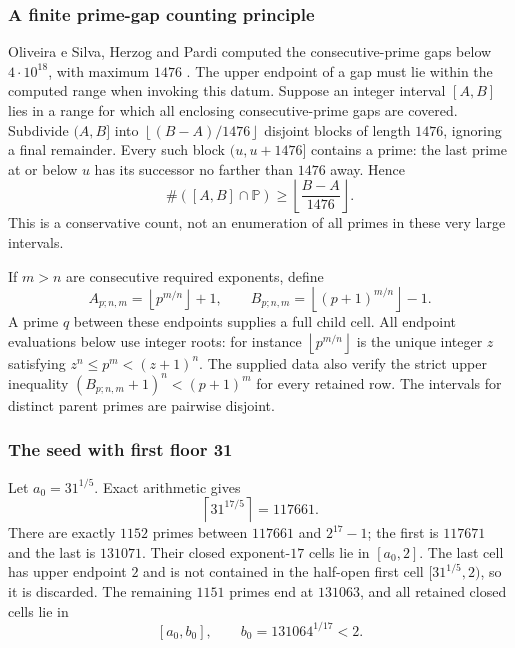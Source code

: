 \documentclass[11pt,a4paper]{article}
\theoremstyle{definition}\newtheorem{definition}[theorem]{Definition}
\theoremstyle{remark}\newtheorem{remark}[theorem]{Remark}
\newcommand{\PP}{\mathbb P}\newcommand{\W}{\mathcal W}\newcommand{\SaitoL}{\mathcal S}
\newcommand{\floor}[1]{\left\lfloor#1\right\rfloor}
\newcommand{\ceil}[1]{\left\lceil#1\right\rceil}
\begin{document}
\subsubsection{A finite prime-gap counting principle}

Oliveira e Silva, Herzog and Pardi computed the consecutive-prime
gaps below $4\cdot10^{18}$, with maximum $1476$
\cite[Section~2.2 and Table~8]{R05-OHP}. The upper endpoint of a gap must
lie within the computed range when invoking this datum.
Suppose an integer interval $[A,B]$ lies in a range for which all
enclosing consecutive-prime gaps are covered. Subdivide $(A,B]$
into $\floor{(B-A)/1476}$ disjoint blocks of length $1476$, ignoring
a final remainder. Every such block $(u,u+1476]$ contains a prime:
the last prime at or below $u$ has its successor no farther than
$1476$ away. Hence
\begin{equation}\label{R05:eq:count1476}
 \#([A,B]\cap\PP)\ge\floor{\frac{B-A}{1476}}.
\end{equation}
This is a conservative count, not an enumeration of all primes in
these very large intervals.

If $m>n$ are consecutive required exponents, define
\begin{equation}\label{R05:eq:AB}
 A_{p;n,m}=\floor{p^{m/n}}+1,\qquad
 B_{p;n,m}=\floor{(p+1)^{m/n}}-1.
\end{equation}
A prime $q$ between these endpoints supplies a full child cell.
All endpoint evaluations below use integer roots: for instance
$\floor{p^{m/n}}$ is the unique integer $z$ satisfying
$z^n\le p^m<(z+1)^n$.
The supplied data also verify the strict upper inequality
$(B_{p;n,m}+1)^n<(p+1)^m$ for every retained row.
The intervals for distinct parent primes are pairwise disjoint.

\subsubsection{The seed with first floor 31}

Let $a_0=31^{1/5}$. Exact arithmetic gives
\[
 \ceil{31^{17/5}}=117661.
\]
There are exactly $1152$ primes between $117661$ and $2^{17}-1$;
the first is $117671$ and the last is $131071$.
Their closed exponent-$17$ cells lie in $[a_0,2]$.
The last cell has upper endpoint $2$ and is not contained in the
half-open first cell $[31^{1/5},2)$, so it is discarded.
The remaining $1151$ primes end at $131063$, and all retained closed
cells lie in
\begin{equation}\label{R05:eq:smallwindow}
 [a_0,b_0],\qquad b_0=131064^{1/17}<2.
\end{equation}
\end{document}
